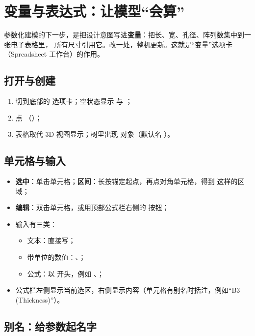 \chapter{变量与表达式：让模型“会算”}

参数化建模的下一步，是把设计意图写进\textbf{变量}：把长、宽、孔径、阵列数集中到一张电子表格里，
所有尺寸引用它。改一处，整机更新。这就是“变量”选项卡（Spreadsheet 工作台）的作用。

\section{打开与创建}

\begin{enumerate}
  \item 切到底部的  选项卡；空状态显示  与 ；
  \item 点 （）；
  \item 表格取代 3D 视图显示；树里出现  对象（默认名 ）。
\end{enumerate}

\section{单元格与输入}

\begin{itemize}
  \item \textbf{选中}：单击单元格；\textbf{区间}：长按锚定起点，再点对角单元格，得到  这样的区域；
  \item \textbf{编辑}：双击单元格，或用顶部公式栏右侧的  按钮；
  \item 输入有三类：
    \begin{itemize}
      \item 文本：直接写；
      \item 带单位的数值：\file{25 mm}、；
      \item 公式：以 \file{=} 开头，例如 、；
    \end{itemize}
  \item 公式栏左侧显示当前选区，右侧显示内容（单元格有别名时括注，例如“B3 (Thickness)”）。
\end{itemize}

\section{别名：给参数起名字}

